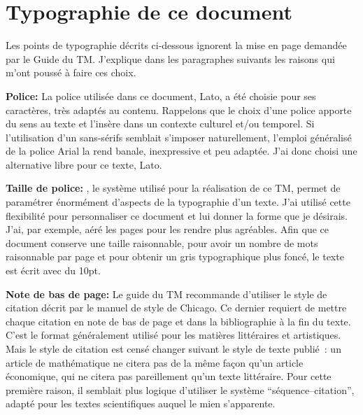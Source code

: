 \chapter{Typographie de ce document}

\hspace*{4.5cm}
\begin{minipage}{\textwidth-4.5cm}
	\setlength{\parskip}{\currentparskip}
	Les points de typographie décrits ci-dessous ignorent la mise en page demandée par le Guide du TM. J'explique dans les paragraphes suivants les raisons qui m'ont poussé à faire ces choix.
	
	\textbf{Police:} La police utilisée dans ce document, Lato, a été choisie pour ses caractères, très adaptés au contenu. Rappelons que le choix d'une police apporte du sens au texte et l'insère dans un contexte culturel et/ou temporel. Si l'utilisation d'un sans-sérifs semblait s'imposer naturellement, l'emploi généralisé de la police Arial la rend banale, inexpressive et peu adaptée. J'ai donc choisi une alternative libre pour ce texte, Lato.
	
	\textbf{Taille de police:} \XeLaTeX, le système utilisé pour la réalisation de ce TM, permet de paramétrer énormément d'aspects de la typographie d'un texte. J'ai utilisé cette flexibilité pour personnaliser ce document et lui donner la forme que je désirais. J'ai, par exemple, aéré les pages pour les rendre plus agréables. Afin que ce document conserve une taille raisonnable, pour avoir un nombre de mots raisonnable par page et pour obtenir un gris typographique plus foncé, le texte est écrit avec du 10pt.
	
	\textbf{Note de bas de page:} Le guide du TM recommande d'utiliser le style de citation décrit par le manuel de style de Chicago. Ce dernier requiert de mettre chaque citation en note de bas de page et dans la bibliographie à la fin du texte. C'est le format généralement utilisé pour les matières littéraires et artistiques. Mais le style de citation est censé changer suivant le style de texte publié : un article de mathématique ne citera pas de la même façon qu'un article économique, qui ne citera pas pareillement qu'un texte littéraire. Pour cette première raison, il semblait plus logique d'utiliser le système \enquote{séquence--citation}\cite{ScientificStyleandFormatOnlineCitationQuickGuide_}, adapté pour les textes scientifiques auquel le mien s’apparente.
\end{minipage}





